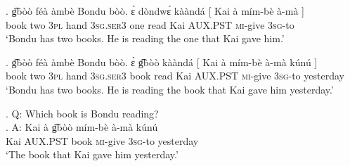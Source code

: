 \documentclass{assets/fieldnotes}
\begin{document}
\exg. g͡bòò féà àmbè Bondu bòò. ɛ̀ dòndwɛ́ kààndá {[} Kai à mím-bè à-mà {]}\\
book two \textsc{3pl} {} hand \textsc{3sg.ser3} one read {} Kai \textsc{AUX.PST} \textsc{mi}-give \textsc{3sg}-to {}\\
`Bondu has two books. He is reading the one that Kai gave him.’

\exg. g͡bòò féà àmbè Bondu bòò. ɛ̀ g͡bòò kààndá {[} Kai à mím-bè à-mà kúnú ]\\
book two \textsc{3pl} {} hand \textsc{3sg.ser3} book read {} Kai \textsc{AUX.PST} \textsc{mi}-give \textsc{3sg}-to yesterday {}\\
`Bondu has two books. He is reading the book that Kai gave him yesterday.’


\ex. Q: Which book is Bondu reading?\\
\ag. A: Kai à g͡bòò mím-bè à-mà kúnú\\
{} Kai \textsc{AUX.PST} book \textsc{mi}-give \textsc{3sg}-to yesterday\\
`The book that Kai gave him yesterday.'\\
\end{document}
